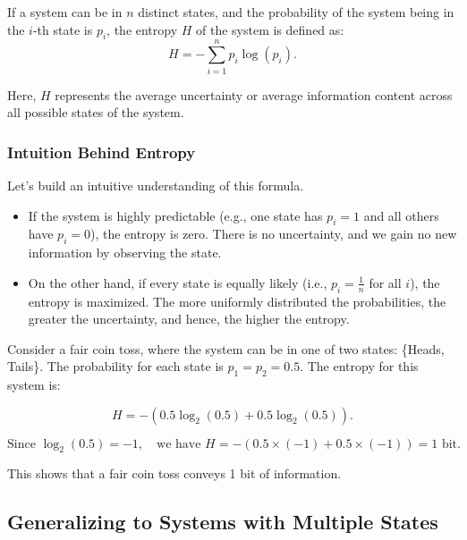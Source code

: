 \documentclass[12pt,a4paper]{article}
\newenvironment{defbox}[1][]{%
  \begin{tcolorbox}[enhanced, breakable, colback=defcolor, colframe=green!50!black, title=#1, fonttitle=\bfseries, arc=3pt, boxrule=0.5pt]
}{\end{tcolorbox}}
\newenvironment{exbox}[1][]{%
  \begin{tcolorbox}[enhanced, breakable, colback=excolor, colframe=brown!50!black, title=#1, fonttitle=\bfseries, arc=3pt, boxrule=0.5pt]
}{\end{tcolorbox}}
\begin{document}
\begin{defbox}[Entropy]
If a system can be in $n$ distinct states, and the probability of the system being in the $i$-th state is $p_i$, the entropy $H$ of the system is defined as:
\begin{equation}
    H = - \sum_{i=1}^{n} p_i \log \left( p_i \right).
\end{equation}
\end{defbox}

Here, $H$ represents the average uncertainty or average information content across all possible states of the system.

\subsubsection{Intuition Behind Entropy}

Let's build an intuitive understanding of this formula.

\begin{itemize}
    \item If the system is highly predictable (e.g., one state has $p_i=1$ and all others have $p_i=0$), the entropy is zero. There is no uncertainty, and we gain no new information by observing the state.
    \item On the other hand, if every state is equally likely (i.e., $p_i = \frac{1}{n}$ for all $i$), the entropy is maximized. The more uniformly distributed the probabilities, the greater the uncertainty, and hence, the higher the entropy.
\end{itemize}

\begin{exbox}[Example: Fair Coin Toss]
    Consider a fair coin toss, where the system can be in one of two states: \{Heads, Tails\}. The probability for each state is $p_1 = p_2 = 0.5$. The entropy for this system is:
    
    \[
    H = - \left( 0.5 \log_2(0.5) + 0.5 \log_2(0.5) \right).
    \]
    
    \[
    \text{Since } \log_2(0.5) = -1, \quad \text{we have } H = - \left( 0.5 \times (-1) + 0.5 \times (-1) \right) = 1 \text{ bit.}
    \]
    
    This shows that a fair coin toss conveys 1 bit of information.
\end{exbox}

\subsection{Generalizing to Systems with Multiple States}
\end{document}
